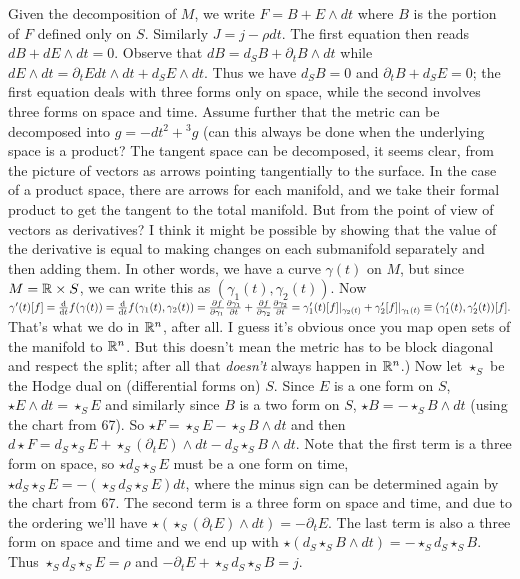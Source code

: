 Given the decomposition of $M$, we write $F=B+E\wedge dt$ where $B$ is the
portion of $F$ defined only on $S$. Similarly $J=j-\rho dt$. 
The first equation then reads $dB+dE\wedge dt=0$. Observe that 
$dB=d_SB+\partial_t B\wedge dt$
while $dE\wedge dt=\partial_t E dt\wedge dt+d_S E\wedge dt$. Thus we have 
$d_S B=0$ and $\partial_t B+d_S E=0$; the first equation deals with three forms 
only on space, while the second involves three forms on space and time. 
Assume further that
the metric can be decomposed into $g=-dt^2+{}^3g$ 
{\small (can this always be done when the underlying space is a product? 
The tangent space can be decomposed, it seems clear, 
from the picture of vectors as arrows pointing tangentially to the surface. In the case of
a product space, there are arrows for each manifold, and we take their formal product
to get the tangent to the total manifold. But from the point of view of vectors 
as derivatives? I think it might be possible by showing that the value of the derivative 
is equal to making changes on each submanifold separately and then adding them. In
other words, we have a curve $\gamma(t)$ on $M$, but since $M=\mathbb{R}\times S$, we
can write this as $(\gamma_1(t),\gamma_2(t))$. Now $\gamma'(t)[f]=\frac{\rm d}{{\rm d}t}f(\gamma(t))=\frac{\rm d}{{\rm d}t}f(\gamma_1(t),\gamma_2(t))=\frac{\partial f}{\partial \gamma_1}\frac{\partial\gamma_1}{\partial t}+\frac{\partial f}{\partial \gamma_2}\frac{\partial\gamma_2}{\partial t}=\gamma_1'(t)[f]|_{\gamma_2(t)}+\gamma_2'[f]|_{\gamma_1(t)}
\equiv(\gamma_1'(t),\gamma_2'(t))[f].$ That's
what we do in $\mathbb{R}^n$, after all. I guess it's obvious once you map open sets of 
the manifold to $\mathbb{R}^n$. But this doesn't mean the metric has to be block diagonal and respect the split; after all that \emph{doesn't} always happen in $\mathbb{R}^n$.)}
Now let $\star_S$ be the Hodge dual on (differential forms on) $S$. Since $E$ is a one form
on $S$, $\star E\wedge dt=\star_S E$ and similarly since $B$ is a two form on $S$, 
$\star B=-\star_S B\wedge dt$ (using the chart from 67).   So $\star F=\star_S E-\star_S B\wedge dt$ and then $d\star F=d_S\star_S E+\star_S(\partial_t E)\wedge dt-d_S\star_S B\wedge dt$. Note that the first term is a three form on space, so $\star d_S\star_S E$ must be a one form on time, $\star d_S\star_S E=-(\star_S d_S\star_S E) dt$, where
the minus sign can be determined again by the chart from 67. The second term is a three form on space and time, and due to the ordering we'll have $\star(\star_S(\partial_t E)\wedge dt)=-\partial_t E$. The last term is also a three form on space and time and
we end up with $\star(d_S\star_S B\wedge dt)=-\star_S d_S\star_S B$. Thus $\star_S d_S\star_S E=\rho$ and $-\partial_t E+\star_S d_S\star_SB=j$.


